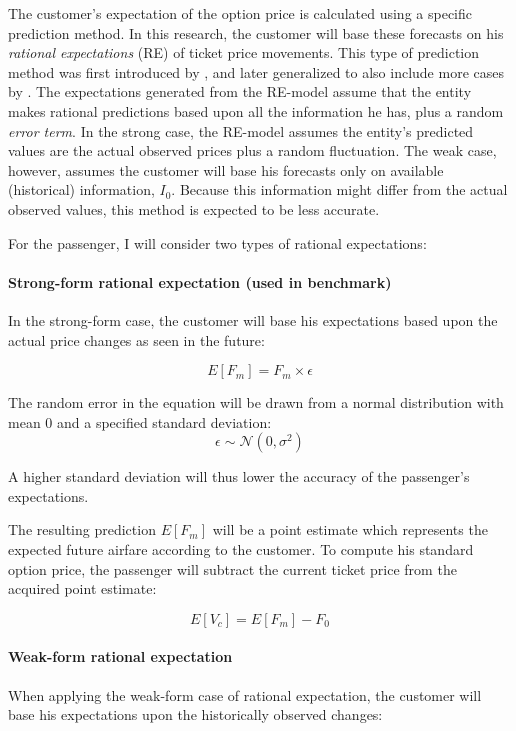 The customer's expectation of the option price is calculated using a specific prediction method. In this research, the customer will base these forecasts on his \emph{rational expectations} (RE) of ticket price movements. This type of prediction method was first introduced by , and later generalized to also include more cases by . The expectations generated from the RE-model assume that the entity makes rational predictions based upon all the information he has, plus a random \emph{error term}. In the strong case, the RE-model assumes the entity's predicted values are the actual observed prices plus a random fluctuation. The weak case, however, assumes the customer will base his forecasts only on available (historical) information, $I_0$. Because this information might differ from the actual observed values, this method is expected to be less accurate.

For the passenger, I will consider two types of rational expectations:

\paragraph{Strong-form rational expectation (used in benchmark)}
In the strong-form case, the customer will base his expectations based upon the actual price changes as seen in the future:

$$ E[F_m] = F_m \times \epsilon$$

The random error in the equation will be drawn from a normal distribution with mean 0 and a specified standard deviation:
$$ \epsilon \sim \mathcal{N} (0, \sigma^2) $$

A higher standard deviation will thus lower the accuracy of the passenger's expectations.

The resulting prediction $E[F_m]$ will be a point estimate which represents the expected future airfare according to the customer. To compute his standard option price, the passenger will subtract the current ticket price from the acquired point estimate:

$$ E[V_c] = E[F_m] - F_0$$


\paragraph{Weak-form rational expectation}
When applying the weak-form case of rational expectation, the customer will base his expectations upon the historically observed changes:


